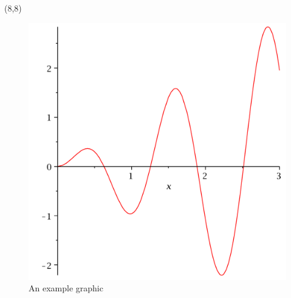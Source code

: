 \documentclass[a0]{a0poster}
\theoremstyle{definition}
\begin{document}
\begin{textblock}{7}(8,8)
\begin{center}
\begin{figure}[h]
\includegraphics[width=200mm]{sampleplot.pdf}
\caption{An example graphic}
\label{graph:sample}
\end{figure}
\end{center}

\end{textblock}
\end{document}
